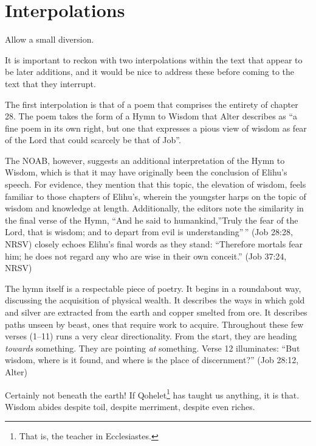 \section*{Interpolations}

Allow a small diversion.

It is important to reckon with two interpolations within the text that appear to be later additions, and it would be nice to address these before coming to the text that they interrupt.

The first interpolation is that of a poem that comprises the entirety of chapter 28. The poem takes the form of a Hymn to Wisdom that Alter describes as ``a fine poem in its own right, but one that expresses a pious view of wisdom as fear of the Lord that could scarcely be that of Job''. \parencite[458]{alter}

The NOAB, however, suggests an additional interpretation of the Hymn to Wisdom, which is that it may have originally been the conclusion of Elihu's speech. For evidence, they mention that this topic, the elevation of wisdom, feels familiar to those chapters of Elihu's, wherein the youngster harps on the topic of wisdom and knowledge at length. Additionally, the editors note the similarity in the final verse of the Hymn, ``And he said to humankind,''Truly the fear of the Lord, that is wisdom; and to depart from evil is understanding''\,'' (Job 28:28, NRSV) closely echoes Elihu's final words as they stand: ``Therefore mortals fear him; he does not regard any who are wise in their own conceit.'' (Job 37:24, NRSV)

The hymn itself is a respectable piece of poetry. It begins in a roundabout way, discussing the acquisition of physical wealth. It describes the ways in which gold and silver are extracted from the earth and copper smelted from ore. It describes paths unseen by beast, ones that require work to acquire. Throughout these few verses (1--11) runs a very clear directionality. From the start, they are heading \emph{towards} something. They are pointing \emph{at} something. Verse 12 illuminates: ``But wisdom, where is it found, and where is the place of discernment?'' (Job 28:12, Alter)

Certainly not beneath the earth! If Qohelet\footnote{That is, the teacher in Ecclesiastes.\footnotemark} has taught us anything, it is that. Wisdom abides despite toil, despite merriment, despite even riches.

